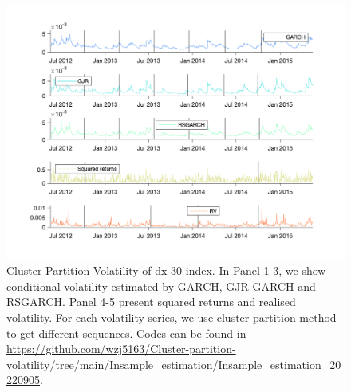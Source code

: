 \documentclass[preprint,12pt,authoryear]{elsarticle}
\begin{document}
\begin{figure}[htbp]
	\begin{center}
		\includegraphics[width=1\textwidth]{Peimin/Volatility_DAX_CP_GARCH_GJR_RSGARCH.png}
		\caption{
		Cluster Partition Volatility of dx 30 index.
			In Panel 1-3, we show conditional volatility estimated by GARCH, GJR-GARCH and RSGARCH. Panel 4-5 present squared returns and realised volatility. For each volatility series, we use cluster partition method to get different sequences. Codes can be found in \url{https://github.com/wzj5163/Cluster-partition-volatility/tree/main/Insample_estimation/Insample_estimation_20220905}.
		}
		\label{fig13_dax} %
	\end{center}
\end{figure}
\end{document}
